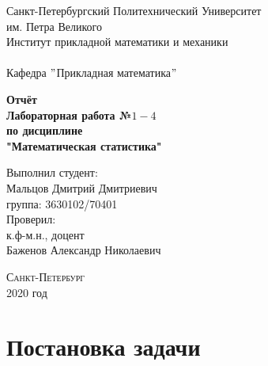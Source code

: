 \documentclass[a4]{article}
\begin{document}
	\def\contentsname{\LARGE{Содержание}}
	\thispagestyle{empty}
	\begin{center} 
		\vspace{2cm} 
		{\Large \sc Санкт-Петербургский Политехнический Университет}\\
		\vspace{2mm}
		{\Large\sc им. Петра Великого}\\
		\vspace{1cm}
		{\large \sc Институт прикладной математики и механики\\ 
			\vspace{0.5mm}
			\textsc{}}\\ 
		\vspace{0.5mm}
		{\large\sc Кафедра $"$Прикладная математика$"$}\\
		\vspace{15mm}
		
		
		{\sc \textbf{Отчёт\\
			Лабораторная работа №$1 - 4$\\
			по дисциплине\\
			"Математическая статистика"}
			\vspace{6mm}
			
		}
		\vspace*{2mm}
		
		
		\begin{flushleft}
			\vspace{4cm}
			\sc Выполнил студент:\\
			\sc Мальцов Дмитрий Дмитриевич\\
			\sc группа: 3630102/70401\\
			\vspace{1cm}
			\sc Проверил:\\
			\sc к.ф-м.н., доцент\\
			\sc Баженов Александр Николаевич
			\vspace{20mm}
		\end{flushleft}
	\end{center} 
	\begin{center}
		\vfill {\large\textsc{Санкт-Петербург}}\\ 
		2020 год
	\end{center}
	
	\newpage
	\pagestyle{plain}
	
	
	\newpage
	\tableofcontents{}
	\newpage
	\listoffigures
	\newpage
	\listoftables
	\newpage
	
	
	\section{Постановка задачи}
	
\end{document}
